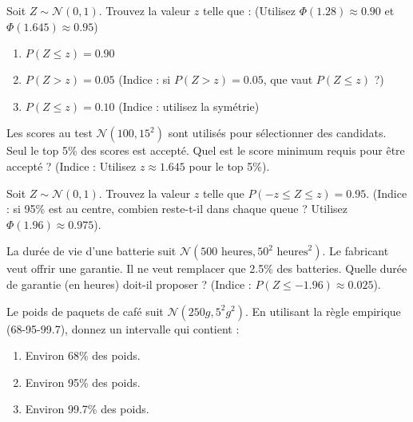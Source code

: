 
\begin{exercicebox}
Soit $Z \sim \mathcal{N}(0, 1)$. Trouvez la valeur $z$ telle que :
(Utilisez $\Phi(1.28) \approx 0.90$ et $\Phi(1.645) \approx 0.95$)
\begin{enumerate}
    \item $P(Z \le z) = 0.90$
    \item $P(Z > z) = 0.05$ (Indice : si $P(Z>z)=0.05$, que vaut $P(Z \le z)$ ?)
    \item $P(Z \le z) = 0.10$ (Indice : utilisez la symétrie)
\end{enumerate}
\end{exercicebox}

\begin{exercicebox}
Les scores au test $\mathcal{N}(100, 15^2)$ sont utilisés pour sélectionner des candidats. Seul le top 5\% des scores est accepté.
Quel est le score minimum requis pour être accepté ?
(Indice : Utilisez $z \approx 1.645$ pour le top 5\%).
\end{exercicebox}

\begin{exercicebox}
Soit $Z \sim \mathcal{N}(0, 1)$. Trouvez la valeur $z$ telle que $P(-z \le Z \le z) = 0.95$.
(Indice : si 95\% est au centre, combien reste-t-il dans chaque queue ? Utilisez $\Phi(1.96) \approx 0.975$).
\end{exercicebox}

\begin{exercicebox}
La durée de vie d'une batterie suit $\mathcal{N}(500 \text{ heures}, 50^2 \text{ heures}^2)$.
Le fabricant veut offrir une garantie. Il ne veut remplacer que 2.5\% des batteries.
Quelle durée de garantie (en heures) doit-il proposer ?
(Indice : $P(Z \le -1.96) \approx 0.025$).
\end{exercicebox}


\begin{exercicebox}
Le poids de paquets de café suit $\mathcal{N}(250g, 5^2g^2)$.
En utilisant la règle empirique (68-95-99.7), donnez un intervalle qui contient :
\begin{enumerate}
    \item Environ 68\% des poids.
    \item Environ 95\% des poids.
    \item Environ 99.7\% des poids.
\end{enumerate}
\end{exercicebox}

